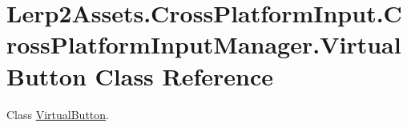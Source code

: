 \hypertarget{class_lerp2_assets_1_1_cross_platform_input_1_1_cross_platform_input_manager_1_1_virtual_button}{}\section{Lerp2\+Assets.\+Cross\+Platform\+Input.\+Cross\+Platform\+Input\+Manager.\+Virtual\+Button Class Reference}
\label{class_lerp2_assets_1_1_cross_platform_input_1_1_cross_platform_input_manager_1_1_virtual_button}


Class \hyperlink{class_lerp2_assets_1_1_cross_platform_input_1_1_cross_platform_input_manager_1_1_virtual_button}{Virtual\+Button}.  



